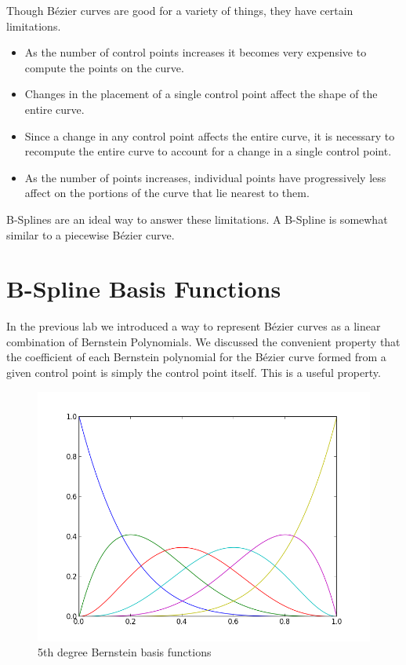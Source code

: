 Though B\'{e}zier curves are good for a variety of things, they have certain limitations.
\begin{itemize}
\item As the number of control points increases it becomes very expensive to compute the points on the curve.
\item Changes in the placement of a single control point affect the shape of the entire curve.
\item Since a change in any control point affects the entire curve, it is necessary to recompute the entire curve to account for a change in a single control point.
\item As the number of points increases, individual points have progressively less affect on the portions of the curve that lie nearest to them.
\end{itemize}

B-Splines are an ideal way to answer these limitations.
A B-Spline is somewhat similar to a piecewise B\'{e}zier curve.

\section*{B-Spline Basis Functions}

In the previous lab we introduced a way to represent B\'{e}zier curves as a linear combination of Bernstein Polynomials.
We discussed the convenient property that the coefficient of each Bernstein polynomial for the B\'{e}zier curve formed from a given control point is simply the control point itself.
This is a useful property.

\begin{figure}
\includegraphics[width=\textwidth]{bernstein_basis}
\caption{5th degree Bernstein basis functions}
\end{figure}

